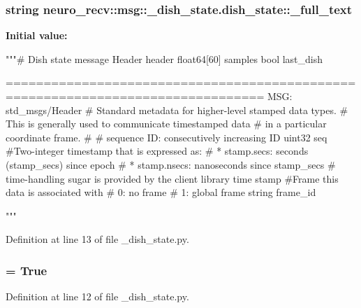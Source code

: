 \subsubsection[{\-\_\-full\-\_\-text}]{\setlength{\rightskip}{0pt plus 5cm}string {\bf neuro\-\_\-recv\-::msg\-::\-\_\-dish\-\_\-state.\-dish\-\_\-state\-::\-\_\-full\-\_\-text}\hspace{0.3cm}{\ttfamily  [static, private]}}\label{classneuro__recv_1_1msg_1_1__dish__state_1_1dish__state_a4775528b511da660f5909692a350b472}
{\bfseries \-Initial value\-:}
\begin{DoxyCode}
"""# Dish state message
Header header
float64[60] samples
bool last_dish

      ================================================================================
MSG: std_msgs/Header
# Standard metadata for higher-level stamped data types.
# This is generally used to communicate timestamped data 
# in a particular coordinate frame.
# 
# sequence ID: consecutively increasing ID 
uint32 seq
#Two-integer timestamp that is expressed as:
# * stamp.secs: seconds (stamp_secs) since epoch
# * stamp.nsecs: nanoseconds since stamp_secs
# time-handling sugar is provided by the client library
time stamp
#Frame this data is associated with
# 0: no frame
# 1: global frame
string frame_id

"""
\end{DoxyCode}


\-Definition at line 13 of file \-\_\-dish\-\_\-state.\-py.

\subsubsection[{\-\_\-has\-\_\-header}]{ = \-True\hspace{0.3cm}{\ttfamily  [static, private]}}\label{classneuro__recv_1_1msg_1_1__dish__state_1_1dish__state_ada3c58cd0d3d849533d0bcfac76c104c}


\-Definition at line 12 of file \-\_\-dish\-\_\-state.\-py.

